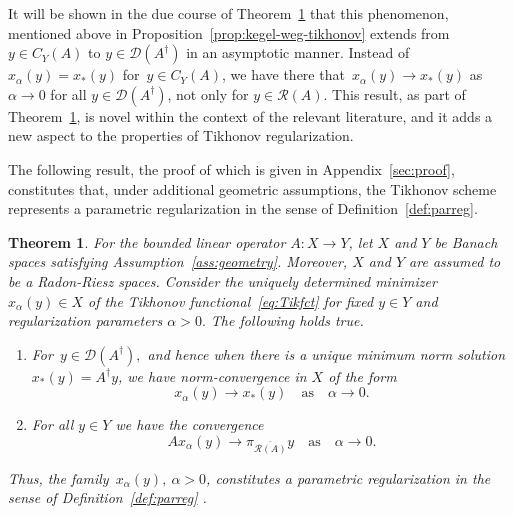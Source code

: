 \documentclass[12pt]{amsart}
\newcommand{\domain}{\mathcal D}
\newcommand{\range}{\mathcal R}
\newcommand{\Ad}{A^\dag}
\newcommand{\xast}{x_\ast}
\newtheorem{theorem}{Theorem}
\theoremstyle{remark}
\begin{document}
It will be shown in the due course of Theorem~\ref{thm:dichotomyparam} that this phenomenon, mentioned above in 
Proposition~\ref{prop:kegel-weg-tikhonov} extends 
from $y \in C_Y(A)$ to $y\in \domain(\Ad)$ in an asymptotic manner. Instead of~$x_\alpha(y)= \xast(y)$ for~$y\in C_Y(A)$, we have there that~$x_\alpha(y) \to \xast(y)$ as $\alpha \to 0$ for all $y\in\domain(\Ad)$, not only for $y \in \range(A)$.
This result, as part of Theorem~\ref{thm:dichotomyparam}, is novel within the context of the relevant literature, and it adds a new aspect to the properties of Tikhonov regularization.
% 

The following result, the proof of which is given in Appendix~\ref{sec:proof}, 
constitutes that, under additional geometric assumptions, the Tikhonov scheme represents a parametric regularization in the sense of Definition~\ref{def:parreg}.

\begin{theorem}\label{thm:dichotomyparam}
  For the bounded linear operator $A\colon X\to Y$, let $X$ and $Y$ be
  Banach spaces satisfying Assumption~\ref{ass:geometry}. Moreover, $X$  and $Y$ are assumed to be a Radon-Riesz spaces. Consider the uniquely determined minimizer $x_\alpha(y) \in X$ of the Tikhonov functional~\eqref{eq:Tikfct} for
  fixed $y \in Y$ and regularization parameters $\alpha>0.$ The following holds true. \begin{enumerate}
      \item  For~$y \in \domain(A^\dagger),$ and hence when there is a unique minimum norm solution $x_*(y)=A^\dagger y$, we have norm-convergence in $X$ of the form
  \begin{equation} \label{eq:normcon}
   x_\alpha(y) \longrightarrow x_*(y) \quad \mbox{as} \quad \alpha \to 0.
  \end{equation}  
      \item For all $y \in Y$ we have the convergence
      \begin{equation} \label{eq:Anormcon}
  Ax_\alpha(y) \longrightarrow \pi_{\overline{\range(A)}} y\quad \mbox{as} \quad \alpha \to 0.
  \end{equation}  
  \end{enumerate}
  Thus, the family~$x_\alpha(y),\ \alpha>0$, constitutes a parametric regularization in the sense of Definition~\ref{def:parreg} .
  \end{theorem}
\end{document}

